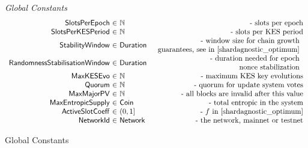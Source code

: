 \begin{figure*}[htb]
  \emph{Global Constants}
  \begin{equation*}
    \begin{array}{r@{~\in~}lr}
      \SlotsPerEpoch & \N & \text{- slots per epoch} \\
      \SlotsPerKESPeriod & \N & \text{- slots per KES period} \\
      \StabilityWindow & \Duration &
      \begin{array}{r}
        \text{- window size for chain growth} \\
        \text{guarantees, see}\text{ in \cite{shardagnostic_optimum}}
      \end{array} \\
      \RandomnessStabilisationWindow & \Duration &
      \begin{array}{r}
        \text{- duration needed for epoch}\\
        \text{nonce stabilization}\\
      \end{array} \\
      \MaxKESEvo & \N & \text{- maximum KES key evolutions}\\
      \Quorum & \N & \text{- quorum for update system votes}\\
      \MaxMajorPV & \N & \text{- all blocks are invalid after this value}\\
      \MaxEntropicSupply & \Coin & \text{- total entropic in the system}\\
      \ActiveSlotCoeff & (0, 1] & \text{ - }f\text{ in \cite{shardagnostic_optimum}}\\
      \NetworkId & \Network & \text{- the network, mainnet or testnet}\\
    \end{array}
  \end{equation*}
  \caption{Global Constants}
  \label{fig:defs:global-constants}
\end{figure*}


